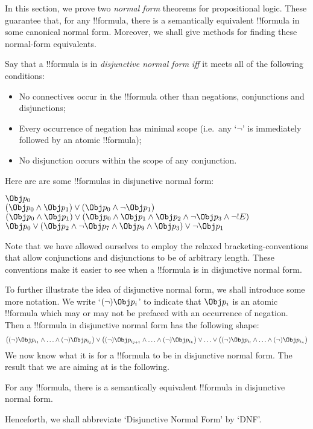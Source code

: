 \documentclass[../../../include/open-logic-section]{subfiles}
\begin{document}


In this section, we prove two \emph{normal form} theorems for propositional logic. These guarantee that, for any !!{formula}, there is a semantically equivalent !!{formula} in some canonical normal form. Moreover, we shall give methods for finding these normal-form equivalents.

Say that a !!{formula} is in \emph{disjunctive normal form} \emph{iff} it meets all of the following conditions:
	\begin{itemize}
		\item No connectives occur in the !!{formula} other than negations, conjunctions and disjunctions;
		\item Every occurrence of negation has minimal scope (i.e.\ any `$\lnot$' is immediately followed by an atomic !!{formula});
		\item No disjunction occurs within the scope of any conjunction.
	\end{itemize}
Here are are some !!{formula}s in disjunctive normal form:
	\begin{center}
		$\Obj p_0$\\
		$(\Obj p_0 \land \Obj p_1) \lor (\Obj p_0 \land \lnot \Obj p_1)$\\
		$(\Obj p_0 \land \Obj p_1) \lor (\Obj p_0 \land  \Obj p_1 \land \Obj p_2 \land \lnot \Obj p_3 \land \lnot !E)$\\
		$\Obj p_0 \lor (\Obj p_2 \land \lnot \Obj p_{7} \land \Obj p_{9} \land \Obj p_3) \lor \lnot \Obj p_1$
	\end{center}
Note that we have allowed ourselves to employ the relaxed bracketing-conventions that allow conjunctions and disjunctions to be of arbitrary length. These conventions make it easier to see when a !!{formula} is in disjunctive normal form. 

To further illustrate the idea of disjunctive normal form, we shall introduce some more notation. We write `$(\lnot) \Obj p_i$' to indicate that $\Obj p_i$ is an atomic !!{formula} which may or may not be prefaced with an occurrence of negation. Then a !!{formula} in disjunctive normal form has the following shape:
	$$\bigl((\lnot) {\Obj p_{i_1}} \land \ldots \land (\lnot) {\Obj p_{i_j}}\bigr) \lor \bigl((\lnot) {\Obj p_{i_{j+1}}} \land \ldots \land (\lnot){\Obj p_{i_k}}\bigr) \lor \ldots \lor \bigl((\lnot){\Obj p_{i_{l}}} \land \ldots \land (\lnot) {\Obj p_{i_n}}\bigr)$$
We now know what it is for a !!{formula} to be in disjunctive normal form. The result that we are aiming at is the following.
	\begin{prop}
	For any !!{formula}, there is a semantically equivalent !!{formula} in disjunctive normal form.
	\end{prop}
Henceforth, we shall abbreviate `Disjunctive Normal Form' by `DNF'. 
\end{document}
